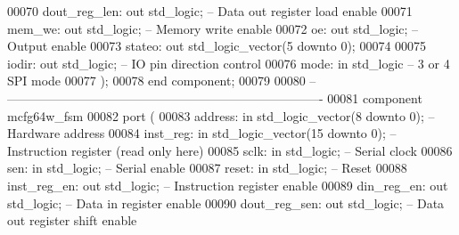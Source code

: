 \begin{DoxyCode}
00070         dout\_reg\_len: \textcolor{keywordflow}{out} \textcolor{comment}{std\_logic};            \textcolor{keyword}{-- Data out register load enable}
00071         mem\_we: \textcolor{keywordflow}{out} \textcolor{comment}{std\_logic};              \textcolor{keyword}{-- Memory write enable}
00072         oe: \textcolor{keywordflow}{out} \textcolor{comment}{std\_logic};              \textcolor{keyword}{-- Output enable}
00073         stateo: \textcolor{keywordflow}{out} \textcolor{comment}{std\_logic\_vector}(\textcolor{vhdllogic}{}\textcolor{vhdllogic}{5} \textcolor{keywordflow}{downto} \textcolor{vhdllogic}{}\textcolor{vhdllogic}{0});
00074 
00075         iodir: \textcolor{keywordflow}{out} \textcolor{comment}{std\_logic};                                               \textcolor{keyword}{-- IO pin direction control}
00076         mode: \textcolor{keywordflow}{in} \textcolor{comment}{std\_logic}\textcolor{keyword}{                                                  -- 3 or 4 SPI mode}
00077     );
00078 \textcolor{keywordflow}{end} \textcolor{keywordflow}{component};
00079 
00080 \textcolor{keyword}{-- ----------------------------------------------------------------------------}
00081 \textcolor{keywordflow}{component} mcfg64w\_fsm
00082     \textcolor{keywordflow}{port} (        
00083         address: \textcolor{keywordflow}{in} \textcolor{comment}{std\_logic\_vector}(\textcolor{vhdllogic}{}\textcolor{vhdllogic}{8} \textcolor{keywordflow}{downto} \textcolor{vhdllogic}{}\textcolor{vhdllogic}{0});   \textcolor{keyword}{-- Hardware address}
00084         inst\_reg: \textcolor{keywordflow}{in} \textcolor{comment}{std\_logic\_vector}(\textcolor{vhdllogic}{}\textcolor{vhdllogic}{15} \textcolor{keywordflow}{downto} \textcolor{vhdllogic}{}\textcolor{vhdllogic}{0}); \textcolor{keyword}{-- Instruction register (read only here)}
00085         sclk: \textcolor{keywordflow}{in} \textcolor{comment}{std\_logic};             \textcolor{keyword}{-- Serial clock}
00086         sen: \textcolor{keywordflow}{in} \textcolor{comment}{std\_logic};              \textcolor{keyword}{-- Serial enable}
00087         reset: \textcolor{keywordflow}{in} \textcolor{comment}{std\_logic};                \textcolor{keyword}{-- Reset}
00088         inst\_reg\_en: \textcolor{keywordflow}{out} \textcolor{comment}{std\_logic};         \textcolor{keyword}{-- Instruction register enable}
00089         din\_reg\_en: \textcolor{keywordflow}{out} \textcolor{comment}{std\_logic};          \textcolor{keyword}{-- Data in register enable}
00090         dout\_reg\_sen: \textcolor{keywordflow}{out} \textcolor{comment}{std\_logic};            \textcolor{keyword}{-- Data out register shift enable}

\end{DoxyCode}
